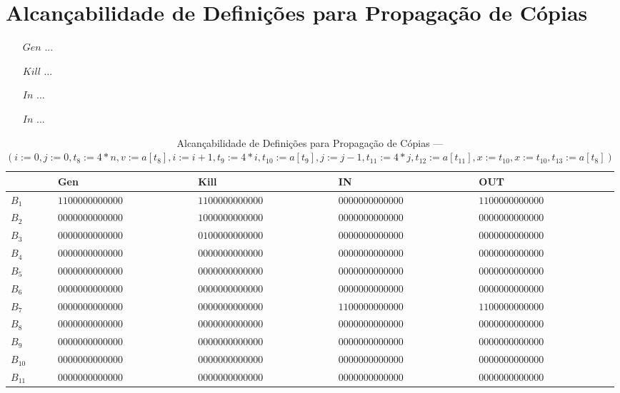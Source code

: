 \section{Alcan\c{c}abilidade de Defini\c{c}\~oes para Propaga\c{c}\~ao de C\'opias}

\begin{itemize}
  \item[$Gen$] ...
  \item[$Kill$] ...
  \item[$In$] ...
  \item[$In$] ...
\end{itemize}

\begin{table}[ht]
\centering
\begin{tabular}{l|l|l|l|l}
	& Gen & Kill & IN & OUT\\
\hline
$B_{1}$ &  $1100000000000$ & $1100000000000$ & $0000000000000$ & $1100000000000$\\
$B_{2}$ &  $0000000000000$ & $1000000000000$ & $0000000000000$ & $0000000000000$\\
$B_{3}$ &  $0000000000000$ & $0100000000000$ & $0000000000000$ & $0000000000000$\\
$B_{4}$ &  $0000000000000$ & $0000000000000$ & $0000000000000$ & $0000000000000$\\
$B_{5}$ &  $0000000000000$ & $0000000000000$ & $0000000000000$ & $0000000000000$\\
$B_{6}$ &  $0000000000000$ & $0000000000000$ & $0000000000000$ & $0000000000000$\\
$B_{7}$ &  $0000000000000$ & $0000000000000$ & $1100000000000$ & $1100000000000$\\
$B_{8}$ &  $0000000000000$ & $0000000000000$ & $0000000000000$ & $0000000000000$\\
$B_{9}$ &  $0000000000000$ & $0000000000000$ & $0000000000000$ & $0000000000000$\\
$B_{10}$ &  $0000000000000$ & $0000000000000$ & $0000000000000$ & $0000000000000$\\
$B_{11}$ &  $0000000000000$ & $0000000000000$ & $0000000000000$ & $0000000000000$\\
\end{tabular}
\caption{Alcan\c{c}abilidade de Defini\c{c}\~oes para Propaga\c{c}\~ao de C\'opias --- $(i:=0, j:=0, t_{8}:=4*n, v:=a[t_{8}], i:=i+1, t_{9}:=4*i, t_{10}:=a[t_{9}], j:=j-1, t_{11}:=4*j, t_{12}:=a[t_{11}], x:=t_{10}, x:=t_{10}, t_{13}:=a[t_{8}])$}
\end{table}

